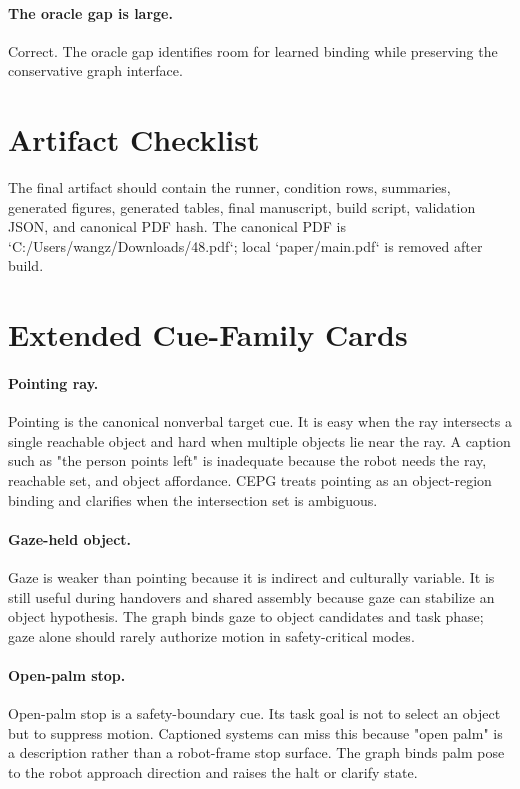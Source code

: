 \documentclass{article}
\newcommand{\method}{CEPG}
\begin{document}
\paragraph{The oracle gap is large.}
Correct. The oracle gap identifies room for learned binding while preserving the conservative graph interface.

\section{Artifact Checklist}

The final artifact should contain the runner, condition rows, summaries, generated figures, generated tables, final manuscript, build script, validation JSON, and canonical PDF hash. The canonical PDF is `C:/Users/wangz/Downloads/48.pdf`; local `paper/main.pdf` is removed after build.

\section{Extended Cue-Family Cards}

\paragraph{Pointing ray.}
Pointing is the canonical nonverbal target cue. It is easy when the ray intersects a single reachable object and hard when multiple objects lie near the ray. A caption such as "the person points left" is inadequate because the robot needs the ray, reachable set, and object affordance. \method{} treats pointing as an object-region binding and clarifies when the intersection set is ambiguous.

\paragraph{Gaze-held object.}
Gaze is weaker than pointing because it is indirect and culturally variable. It is still useful during handovers and shared assembly because gaze can stabilize an object hypothesis. The graph binds gaze to object candidates and task phase; gaze alone should rarely authorize motion in safety-critical modes.

\paragraph{Open-palm stop.}
Open-palm stop is a safety-boundary cue. Its task goal is not to select an object but to suppress motion. Captioned systems can miss this because "open palm" is a description rather than a robot-frame stop surface. The graph binds palm pose to the robot approach direction and raises the halt or clarify state.
\end{document}
